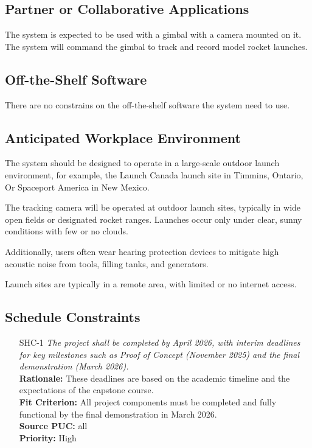 \documentclass[12pt]{article}
\begin{document}
\subsection{Partner or Collaborative Applications}

The system is expected to be used with a gimbal with a camera mounted on it.
The system will command the gimbal to track and record model rocket launches.

\subsection{Off-the-Shelf Software}

There are no constrains on the off-the-shelf software the system need to use.

\subsection{Anticipated Workplace Environment}

The system should be designed to operate in a large-scale outdoor launch
environment, for example, the Launch Canada launch site in Timmins, Ontario, Or
Spaceport America in New Mexico.

The tracking camera will be operated at outdoor launch sites, typically in wide
open fields or designated rocket ranges. Launches occur only under clear, sunny
conditions with few or no clouds.

Additionally, users often wear hearing protection devices to mitigate high
acoustic noise from tools, filling tanks, and generators.

Launch sites are typically in a remote area, with limited or no internet
access.

\subsection{Schedule Constraints}

\begin{itemize}[leftmargin=*]
  \item[SHC-1] \emph{The project shall be completed by April 2026, with interim
          deadlines for key milestones such as Proof of Concept (November 2025) and the
          final demonstration (March 2026).}\\[2mm]
        \textbf{Rationale:} These deadlines are based on the academic timeline and the expectations of the capstone course.\\
        \textbf{Fit Criterion:} All project components must be completed and fully functional by the final demonstration in March 2026.\\
        \textbf{Source PUC:} all\\
        \textbf{Priority:} High
\end{itemize}
\end{document}
